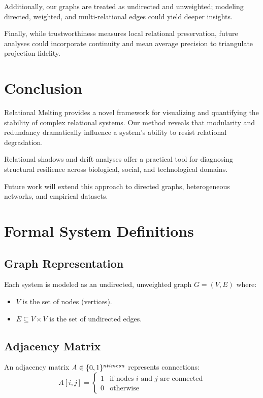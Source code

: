 \documentclass[conference]{IEEEtran}
\begin{document}
Additionally, our graphs are treated as undirected and unweighted; modeling directed, weighted, and multi-relational edges could yield deeper insights.

Finally, while trustworthiness measures local relational preservation, future analyses could incorporate continuity and mean average precision to triangulate projection fidelity.

\section{Conclusion}
Relational Melting provides a novel framework for visualizing and quantifying the stability of complex relational systems.  
Our method reveals that modularity and redundancy dramatically influence a system's ability to resist relational degradation.

Relational shadows and drift analyses offer a practical tool for diagnosing structural resilience across biological, social, and technological domains.

Future work will extend this approach to directed graphs, heterogeneous networks, and empirical datasets.

\appendices

\section{Formal System Definitions}

\subsection{Graph Representation}
Each system is modeled as an undirected, unweighted graph $G = (V, E)$ where:
\begin{itemize}
    \item $V$ is the set of nodes (vertices).
    \item $E \subseteq V \times V$ is the set of undirected edges.
\end{itemize}

\subsection{Adjacency Matrix}
An adjacency matrix $A \in \{0,1\}^{n \\times n}$ represents connections:
\[
A[i,j] =
\begin{cases}
1 & \text{if nodes } i \text{ and } j \text{ are connected} \\
0 & \text{otherwise}
\end{cases}
\]
\end{document}
